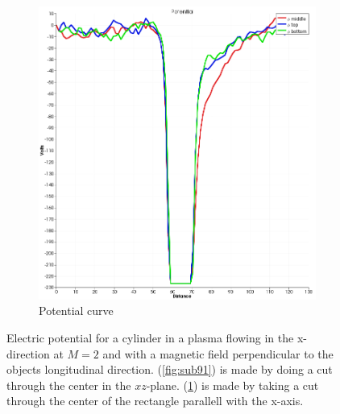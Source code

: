 \documentclass[twoside]{article}
\begin{document}
\begin{figure}[H]
\begin{subfigure}{.5\textwidth}
  \includegraphics[width=\linewidth]{phispot_2sim_oslo_B50.png}
  \caption{Potential curve}
  \label{fig:sub92}
\end{subfigure}
\caption{Electric potential for a cylinder in a plasma flowing in the x-direction at $M=2$ and with a magnetic field perpendicular to the objects longitudinal direction. (\ref{fig:sub91}) is made by doing a cut through the center in the $xz$-plane. (\ref{fig:sub92}) is made by taking a cut through the center of the rectangle parallell with the x-axis.}
\label{fig:9}
\end{figure}
\end{document}
